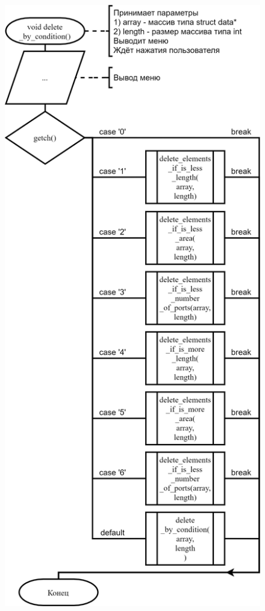 \begin{figure}[!htp]
    \includegraphics{../src/submenu/delete_by_condition/delete_by_condition-1.png}
\end{figure}

